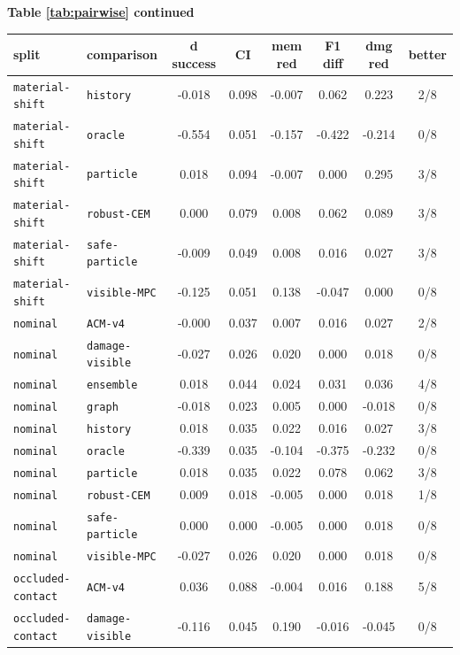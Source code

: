 \documentclass{article}
\begin{document}
\begin{center}
\textbf{Table \ref{tab:pairwise} continued}\\[0.4ex]
\begin{tabular}{llcccccc}
\toprule
split & comparison & d success & CI & mem red & F1 diff & dmg red & better \\
\midrule
\texttt{material-shift} & \texttt{history} & -0.018 & 0.098 & -0.007 & 0.062 & 0.223 & 2/8 \\
\texttt{material-shift} & \texttt{oracle} & -0.554 & 0.051 & -0.157 & -0.422 & -0.214 & 0/8 \\
\texttt{material-shift} & \texttt{particle} & 0.018 & 0.094 & -0.007 & 0.000 & 0.295 & 3/8 \\
\texttt{material-shift} & \texttt{robust-CEM} & 0.000 & 0.079 & 0.008 & 0.062 & 0.089 & 3/8 \\
\texttt{material-shift} & \texttt{safe-particle} & -0.009 & 0.049 & 0.008 & 0.016 & 0.027 & 3/8 \\
\texttt{material-shift} & \texttt{visible-MPC} & -0.125 & 0.051 & 0.138 & -0.047 & 0.000 & 0/8 \\
\texttt{nominal} & \texttt{ACM-v4} & -0.000 & 0.037 & 0.007 & 0.016 & 0.027 & 2/8 \\
\texttt{nominal} & \texttt{damage-visible} & -0.027 & 0.026 & 0.020 & 0.000 & 0.018 & 0/8 \\
\texttt{nominal} & \texttt{ensemble} & 0.018 & 0.044 & 0.024 & 0.031 & 0.036 & 4/8 \\
\texttt{nominal} & \texttt{graph} & -0.018 & 0.023 & 0.005 & 0.000 & -0.018 & 0/8 \\
\texttt{nominal} & \texttt{history} & 0.018 & 0.035 & 0.022 & 0.016 & 0.027 & 3/8 \\
\texttt{nominal} & \texttt{oracle} & -0.339 & 0.035 & -0.104 & -0.375 & -0.232 & 0/8 \\
\texttt{nominal} & \texttt{particle} & 0.018 & 0.035 & 0.022 & 0.078 & 0.062 & 3/8 \\
\texttt{nominal} & \texttt{robust-CEM} & 0.009 & 0.018 & -0.005 & 0.000 & 0.018 & 1/8 \\
\texttt{nominal} & \texttt{safe-particle} & 0.000 & 0.000 & -0.005 & 0.000 & 0.018 & 0/8 \\
\texttt{nominal} & \texttt{visible-MPC} & -0.027 & 0.026 & 0.020 & 0.000 & 0.018 & 0/8 \\
\texttt{occluded-contact} & \texttt{ACM-v4} & 0.036 & 0.088 & -0.004 & 0.016 & 0.188 & 5/8 \\
\texttt{occluded-contact} & \texttt{damage-visible} & -0.116 & 0.045 & 0.190 & -0.016 & -0.045 & 0/8 \\

\end{tabular}
\end{center}
\end{document}
